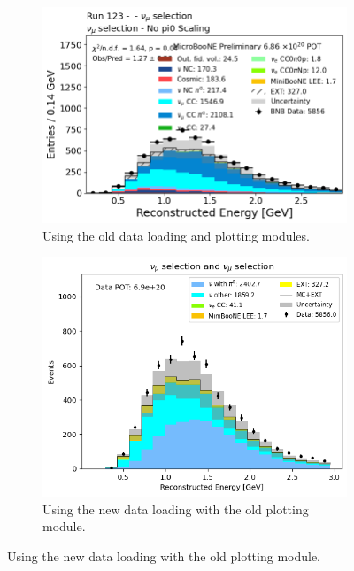 \begin{figure}[H]
 \centering
    \begin{subfigure}[t]{0.32\linewidth}
        \includegraphics[width=\linewidth]{technote/EventSelections/Figures/Run123_NuMu_RecoEnergy_Old.png}
        \caption{Using the old data loading and plotting modules.}
    \end{subfigure}%
    \hspace{0.3cm}%
    \begin{subfigure}[t]{0.32\linewidth}
        \includegraphics[width=\linewidth]{technote/EventSelections/Figures/Run123_NuMu_RecoEnergy_Alex.png}%
        \caption{Using the new data loading with the old plotting module.}
    \end{subfigure}%

\end{figure}
